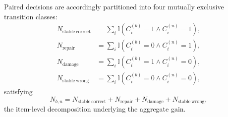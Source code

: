 \begin{description}
Paired decisions are accordingly partitioned into four mutually exclusive transition classes:
\begin{equation}
\begin{aligned}
N_{\mathrm{stable\ correct}}
&=
\sum_i
\mathbb{I}
\left(
C_i^{(b)}=1
\land
C_i^{(n)}=1
\right),\\
N_{\mathrm{repair}}
&=
\sum_i
\mathbb{I}
\left(
C_i^{(b)}=0
\land
C_i^{(n)}=1
\right),\\
N_{\mathrm{damage}}
&=
\sum_i
\mathbb{I}
\left(
C_i^{(b)}=1
\land
C_i^{(n)}=0
\right),\\
N_{\mathrm{stable\ wrong}}
&=
\sum_i
\mathbb{I}
\left(
C_i^{(b)}=0
\land
C_i^{(n)}=0
\right),
\end{aligned}
\end{equation}
satisfying
\begin{equation}
N_{b,n}
=
N_{\mathrm{stable\ correct}}
+
N_{\mathrm{repair}}
+
N_{\mathrm{damage}}
+
N_{\mathrm{stable\ wrong}},
\end{equation}
the item-level decomposition underlying the aggregate gain.
\end{description}
